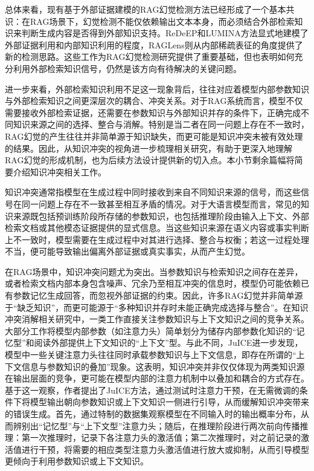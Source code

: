 总体来看，现有基于外部证据建模的RAG幻觉检测方法已经形成了一个基本共识：在RAG场景下，幻觉检测不能仅依赖输出文本本身，而必须结合外部检索知识来判断生成内容是否得到外部知识支持。ReDeEP和LUMINA方法显式地建模了外部证据利用和内部知识利用的程度，RAGLens则从内部稀疏表征的角度提供了新的检测思路。这些工作为RAG幻觉检测研究提供了重要基础，但也表明如何充分利用外部检索知识信号，仍然是该方向有待解决的关键问题。

进一步来看，外部检索知识利用不足这一现象背后，往往对应着模型内部参数知识与外部检索知识之间更深层次的耦合、冲突关系。对于RAG系统而言，模型不仅需要接收外部检索证据，还需要在参数知识与外部知识并存的条件下，正确完成不同知识来源之间的选择、整合与消解。特别是当二者在同一问题上存在不一致时，RAG幻觉的产生往往并非简单源于知识缺失，而更可能是知识冲突未被有效处理的结果。因此，从知识冲突的视角进一步梳理相关研究，有助于更深入地理解RAG幻觉的形成机制，也为后续方法设计提供新的切入点。本小节剩余篇幅将简要介绍知识冲突相关工作。


知识冲突通常指模型在生成过程中同时接收到来自不同知识来源的信号，而这些信号在同一问题上存在不一致甚至相互矛盾的情况\cite{xu2024knowledge,li2025taming,longpre2021entity}。对于大语言模型而言，常见的知识来源既包括预训练阶段所存储的参数知识，也包括推理阶段由输入上下文、外部检索文档或其他模态证据提供的显式信息。当这些知识来源在语义内容或事实判断上不一致时，模型需要在生成过程中对其进行选择、整合与权衡；若这一过程处理不当，便可能导致输出偏离外部证据或真实事实，从而产生幻觉。

在RAG场景中，知识冲突问题尤为突出。当参数知识与检索知识之间存在差异，或者检索文档内部本身包含噪声、冗余乃至相互冲突的信息时，模型仍可能依赖已有参数记忆生成回答，而忽视外部证据的约束。因此，许多RAG幻觉并非简单源于“缺乏知识”，而更可能源于“多种知识并存时未能正确完成选择与整合”。在知识冲突消解相关研究中，一类工作直接关注参数知识与上下文知识之间的竞争关系。大部分工作将模型内部参数（如注意力头）简单划分为储存内部参数化知识的“记忆型”和阅读外部提供上下文知识的“上下文”型。与此不同，JuICE\cite{li2025taming}进一步发现，模型中一些关键注意力头往往同时承载参数知识与上下文信息，即存在所谓的“上下文信息与参数知识的叠加”现象。这表明，知识冲突并非仅仅体现为两类知识源在输出层面的竞争，更可能在模型内部的注意力机制中以叠加和耦合的方式存在。基于这一观察，作者提出了JuICE方法，通过测试时注意力干预，在无需微调的条件下将模型输出朝向参数知识或上下文知识一侧进行引导，从而缓解知识冲突带来的错误生成。首先，通过特制的数据集观察模型在不同输入时的输出概率分布，从而辨别出“记忆型”与“上下文型”注意力头；随后，在推理阶段进行两次前向传播推理：第一次推理时，记录下各注意力头的激活值；第二次推理时，对之前记录的激活值进行干预，将需要的相应类型注意力头激活值进行放大或抑制，从而引导模型更倾向于利用参数知识或上下文知识。

